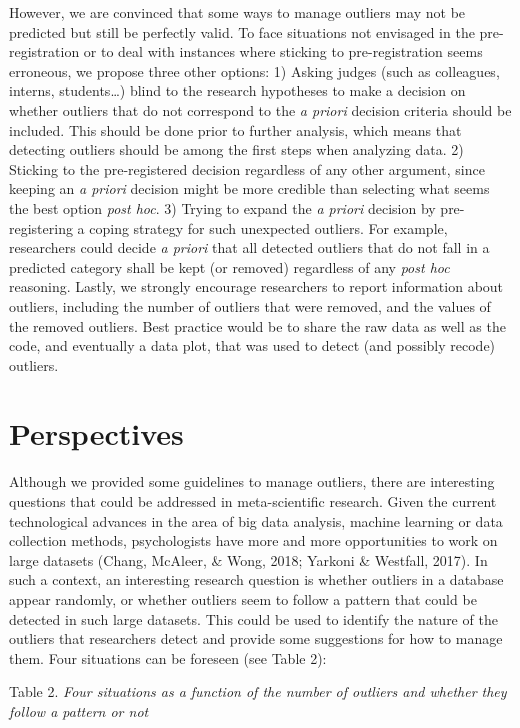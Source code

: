 \documentclass[man,floatsintext]{apa6}
\begin{document}
However, we are convinced that some ways to manage outliers may not be
predicted but still be perfectly valid. To face situations not envisaged
in the pre-registration or to deal with instances where sticking to
pre-registration seems erroneous, we propose three other options: 1)
Asking judges (such as colleagues, interns, students\ldots{}) blind to
the research hypotheses to make a decision on whether outliers that do
not correspond to the \emph{a priori} decision criteria should be
included. This should be done prior to further analysis, which means
that detecting outliers should be among the first steps when analyzing
data. 2) Sticking to the pre-registered decision regardless of any other
argument, since keeping an \emph{a priori} decision might be more
credible than selecting what seems the best option \emph{post hoc}. 3)
Trying to expand the \emph{a priori} decision by pre-registering a
coping strategy for such unexpected outliers. For example, researchers
could decide \emph{a priori} that all detected outliers that do not fall
in a predicted category shall be kept (or removed) regardless of any
\emph{post hoc} reasoning. Lastly, we strongly encourage researchers to
report information about outliers, including the number of outliers that
were removed, and the values of the removed outliers. Best practice
would be to share the raw data as well as the code, and eventually a
data plot, that was used to detect (and possibly recode) outliers.

\section{Perspectives}\label{perspectives}

Although we provided some guidelines to manage outliers, there are
interesting questions that could be addressed in meta-scientific
research. Given the current technological advances in the area of big
data analysis, machine learning or data collection methods,
psychologists have more and more opportunities to work on large datasets
(Chang, McAleer, \& Wong, 2018; Yarkoni \& Westfall, 2017). In such a
context, an interesting research question is whether outliers in a
database appear randomly, or whether outliers seem to follow a pattern
that could be detected in such large datasets. This could be used to
identify the nature of the outliers that researchers detect and provide
some suggestions for how to manage them. Four situations can be foreseen
(see Table 2):

Table 2. \emph{Four situations as a function of the number of outliers
and whether they follow a pattern or not}
\end{document}
